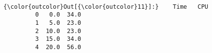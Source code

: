 \documentclass[11pt]{article}
\begin{document}
    \begin{center}
    \end{center}
    { \hspace*{\fill} \\}
    
\begin{Verbatim}[commandchars=\\\{\}]
{\color{outcolor}Out[{\color{outcolor}11}]:}    Time   CPU
         0   0.0  34.0
         1   5.0  23.0
         2  10.0  23.0
         3  15.0  34.0
         4  20.0  56.0
\end{Verbatim}
            

    
    
    
    
\end{document}
